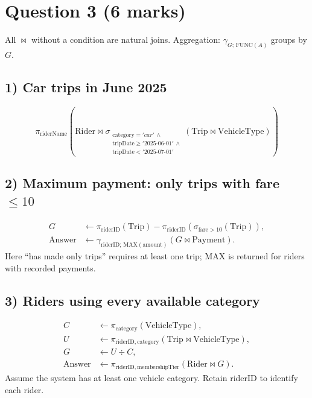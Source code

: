 \documentclass[11pt,a4paper]{article}
\begin{document}
\section*{Question 3 (6 marks)}
All $\bowtie$ without a condition are natural joins.
Aggregation: $\gamma_{G;\,\mathrm{FUNC}(A)}$ groups by $G$.

\subsection*{1) Car trips in June 2025}
\[
\boxed{\pi_{\mathrm{riderName}}\!\left(
\mathrm{Rider}\bowtie
\sigma_{\substack{\mathrm{category}='car'\,\land\\
\mathrm{tripDate}\ge '2025\text{-}06\text{-}01'\,\land\\
\mathrm{tripDate}< '2025\text{-}07\text{-}01'}}
(\mathrm{Trip}\bowtie\mathrm{VehicleType})\right)}
\]
\subsection*{2) Maximum payment: only trips with fare $\le 10$}
\begin{align*}
G&\leftarrow\pi_{\mathrm{riderID}}(\mathrm{Trip})
 -\pi_{\mathrm{riderID}}(\sigma_{\mathrm{fare}>10}(\mathrm{Trip})),\\[3pt]
\boxed{\mathrm{Answer}}&\boxed{\leftarrow
\gamma_{\mathrm{riderID};\,\mathrm{MAX}(\mathrm{amount})}(G\bowtie\mathrm{Payment})}.
\end{align*}
Here ``has made only trips'' requires at least one trip; MAX is returned for riders
with recorded payments.

\subsection*{3) Riders using every available category}
\begin{align*}
C&\leftarrow\pi_{\mathrm{category}}(\mathrm{VehicleType}),\\
U&\leftarrow\pi_{\mathrm{riderID},\mathrm{category}}
 (\mathrm{Trip}\bowtie\mathrm{VehicleType}),\\
G&\leftarrow U\div C,\\[3pt]
\boxed{\mathrm{Answer}}&\boxed{\leftarrow
\pi_{\mathrm{riderID},\mathrm{membershipTier}}(\mathrm{Rider}\bowtie G)}.
\end{align*}
Assume the system has at least one vehicle category. Retain riderID to identify each rider.
\end{document}
